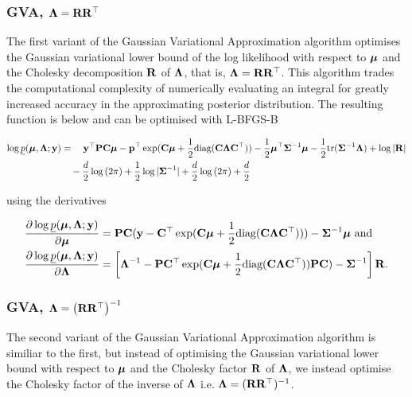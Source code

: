 \documentclass{article}[12pt]
\begin{document}
\subsubsection{GVA, ${\boldsymbol \Lambda} = {\bf R} {\bf R}^\top$}

The first variant of the Gaussian Variational Approximation algorithm
optimises the Gaussian variational lower bound of the log likelihood with
respect to ${\boldsymbol \mu}$ and the Cholesky decomposition ${\bf R}$ of ${\boldsymbol \Lambda}$, that is,
${\boldsymbol \Lambda} = {\bf R} {\bf R}^\top$. This algorithm trades the computational complexity of
numerically evaluating an integral for greatly increased accuracy in the
approximating posterior distribution. The resulting function is below and  can
be optimised with L-BFGS-B

\begin{align*}
\log \underline{p}({\boldsymbol \mu}, {\boldsymbol \Lambda}; {\bf y}) &= \quad {\bf y}^\top{\bf P} {\bf C} {\boldsymbol\mu} - {\bf p}^\top \exp({\bf C} {\boldsymbol \mu} + {\frac{1}{2}} \text{diag}({\bf C} {\boldsymbol \Lambda} {\bf C}^\top)) - {\frac{1}{2}} {\boldsymbol \mu}^\top {\boldsymbol\Sigma}^{-1} {\boldsymbol \mu} - {\frac{1}{2}} \text{tr}{({\boldsymbol\Sigma}^{-1} {\boldsymbol\Lambda})} + \log{|{\bf R}|} \\
&\quad - \frac{d}{2} \log{(2 \pi)} + {\frac{1}{2}} \log{|{\boldsymbol\Sigma}^{-1}|} + \frac{d}{2} \log{(2 \pi)} + \frac{d}{2} \\
\end{align*}

using the derivatives

\begin{align*}
\frac{\partial \log \underline{p}({\boldsymbol \mu}, {\boldsymbol \Lambda}; {\bf y})}{\partial {\boldsymbol\mu}} &= {\bf P} {\bf C} ({\bf y} - {\bf C}^\top \exp({\bf C} {\boldsymbol \mu} + {\frac{1}{2}} \text{diag}{({\bf C}{\boldsymbol\Lambda}{\bf C}^\top)})) - {\boldsymbol \Sigma}^{-1} {\boldsymbol \mu} \text{ and}\\
\frac{\partial \log \underline{p}({\boldsymbol \mu}, {\boldsymbol \Lambda}; {\bf y})}{\partial {\boldsymbol\Lambda}} &= \left [{\boldsymbol \Lambda}^{-1} - {\bf P} {\bf C}^\top \exp({\bf C} {\boldsymbol \mu} + {\frac{1}{2}} \text{diag}({\bf C} {\boldsymbol \Lambda} {\bf C}^\top)) {\bf P} {\bf C}) - {\boldsymbol \Sigma}^{-1} \right ] {\bf R}.
\end{align*}

\subsubsection{GVA, ${\boldsymbol \Lambda} = \left ({\bf R} {\bf R}^\top \right )^{-1}$}
The second variant of the Gaussian Variational Approximation algorithm is similiar 
to the first, but instead of optimising the Gaussian variational lower bound with respect to
${\boldsymbol \mu}$ and the Cholesky factor ${\bf R}$ of ${\boldsymbol \Lambda}$, we instead optimise the Cholesky factor of the inverse of
${\boldsymbol \Lambda}$ i.e. ${\boldsymbol \Lambda} = ({\bf R} {\bf R}^\top)^{-1}$.
\end{document}
